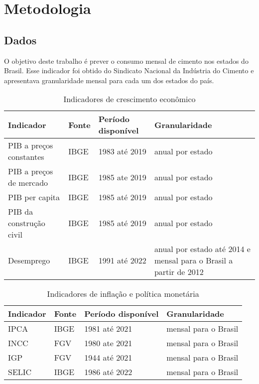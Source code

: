 
\chapter{Metodologia}

\section{Dados}

O objetivo deste trabalho é prever o consumo mensal de cimento nos estados 
do Brasil. Esse indicador foi obtido do Sindicato Nacional da Indústria do 
Cimento e apresentava granularidade mensal para cada um dos estados do 
país.

\begin{table}[H]
    \centering
    \caption{Indicadores de crescimento econômico}
    \begin{tabular}{llll}
        \toprule
        Indicador                   & Fonte & Período disponível & Granularidade         \\
        \midrule
        PIB a preços constantes     & IBGE  & 1983 até 2019      & anual por estado      \\
        PIB a preços de mercado     & IBGE  & 1985 ate 2019      & anual por estado      \\
        PIB per capita              & IBGE  & 1985 até 2019      & anual por estado      \\
        PIB da construção civil     & IBGE  & 1985 até 2019      & anual por estado      \\
        Desemprego                  & IBGE  & 1991 até 2022      & anual por estado até 2014 e mensal para o Brasil a partir de 2012      \\
        \bottomrule
    \end{tabular}
\end{table}

\begin{table}[H]
    \centering
    \caption{Indicadores de inflação e política monetária}
    \begin{tabular}{llll}
        \toprule
        Indicador                   & Fonte & Período disponível & Granularidade         \\
        \midrule
        IPCA                        & IBGE  & 1981 até 2021      & mensal para o Brasil      \\
        INCC                        & FGV   & 1980 ate 2021      & mensal para o Brasil      \\
        IGP                         & FGV   & 1944 até 2021      & mensal para o Brasil      \\
        SELIC                       & IBGE  & 1986 até 2022      & mensal para o Brasil      \\
        \bottomrule
    \end{tabular}
\end{table}

